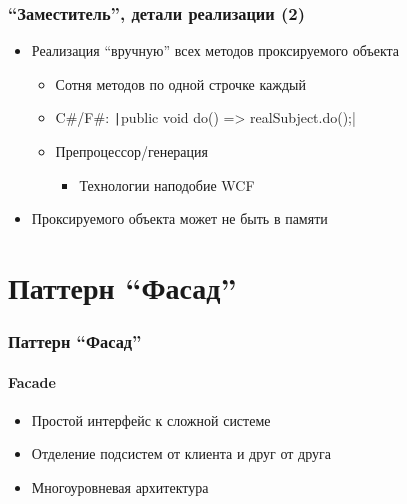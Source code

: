 \documentclass[xetex,mathserif,serif]{beamer}
\begin{document}
	\begin{frame}
		\frametitle{``Заместитель'', детали реализации (2)}
		\begin{itemize}
			\item Реализация ``вручную'' всех методов проксируемого объекта
			\begin{itemize}
				\item Сотня методов по одной строчке каждый
				\item C\#/F\#: \texttt|public void do() => realSubject.do();|
				\item Препроцессор/генерация
				\begin{itemize}
					\item Технологии наподобие WCF
				\end{itemize}
			\end{itemize}
			\item Проксируемого объекта может не быть в памяти
		\end{itemize}
	\end{frame}

	\section{Паттерн ``Фасад''}

	\begin{frame}
		\frametitle{Паттерн ``Фасад''}
		\framesubtitle{Facade}
		\begin{itemize}
			\item Простой интерфейс к сложной системе
			\item Отделение подсистем от клиента и друг от друга
			\item Многоуровневая архитектура
		\end{itemize}
	\end{frame}
\end{document}
